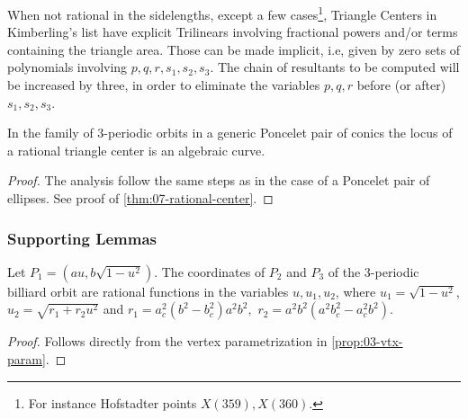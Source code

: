 When not rational in the sidelengths, except a few cases\footnote{For instance Hofstadter points $X(359), X(360)$.}, Triangle Centers
in Kimberling's list have explicit Trilinears involving fractional powers and/or terms containing the triangle area. Those can be made implicit, i.e,
given by zero sets of polynomials involving $p,q,r, s_1, s_2, s_3$.  The chain of resultants to be computed will be increased by three, in order to eliminate the variables $p,q, r$ before (or after) $s_1, s_2, s_3$.

 \begin{theorem}\label{thm:loci_algebraic_general}
 In the family of 3-periodic orbits in a generic Poncelet pair of conics the locus of a rational triangle center is an algebraic curve. 
 \end{theorem}

 \begin{proof}
 The analysis follow the same steps as in the case of a Poncelet pair of ellipses.  See proof of \cref{thm:07-rational-center}. 
\end{proof}

\subsubsection{Supporting Lemmas}
\label{sec:supporting-lemmas}

\begin{lemma}
\label{lem:1coord}
Let $P_1=({a}{u},b\sqrt{1-u^2}).$
	The coordinates of $P_2$ and $P_3$ of the 3-periodic billiard orbit are rational functions in the variables $u, u_1, u_2$, where
	$u_1=\sqrt{1-u^2}$, $u_2=\sqrt{r_1+r_2 u^2}$ 
and
	$r_1= a_c^2(b^2 - b_c^2)a^2b^2,$ $ r_2= a^2b^2(a^2b_c^2 - a_c^2b^2)$.  
		
	\end{lemma}
	
	\begin{proof}
	Follows directly from the vertex parametrization in \cref{prop:03-vtx-param}.
\end{proof}
	
	
	


